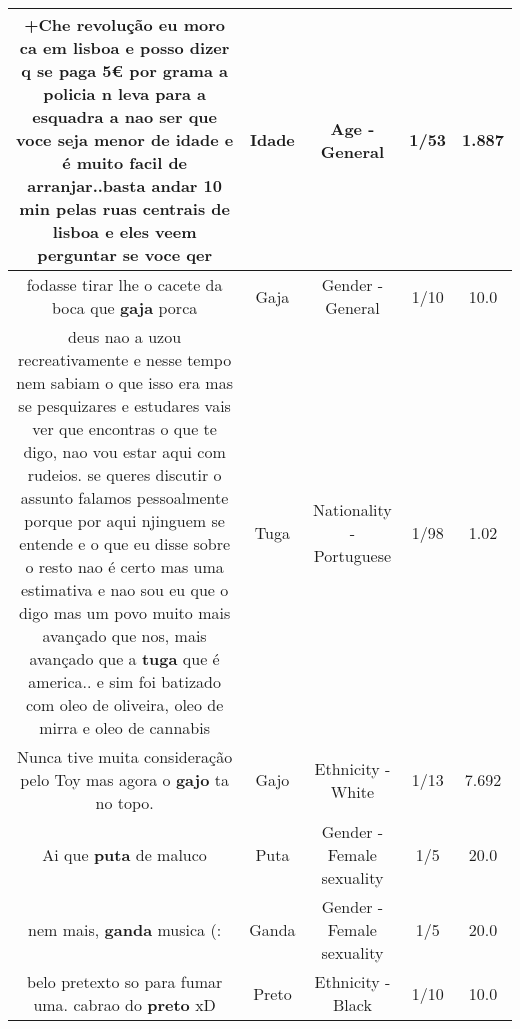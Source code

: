 \documentclass[11pt]{article}
\newlength\mylength
\begin{document}
\begin{center}
\begin{longtable}{|C{.65\mylength}|C{.30\mylength}|C{.12\mylength}|C{.12\mylength}|C{.12\mylength}|}
  \small +Che revolução eu moro ca em lisboa e posso dizer q se paga 5€ por grama a policia n leva para a esquadra a nao ser que voce seja menor de \textbf{idade} e é muito facil de arranjar..basta andar 10 min pelas ruas centrais de lisboa e eles veem perguntar se voce qer\normalsize   & Idade & Age - General & 1/53 & 1.887 \\  \hline
  \small fodasse tirar lhe o cacete da boca que \textbf{gaja} porca\normalsize   & Gaja & Gender - General & 1/10 & 10.0 \\  \hline
  \small deus nao a uzou recreativamente e nesse tempo nem sabiam o que isso era mas se pesquizares e estudares vais ver que encontras o que te digo, nao vou estar aqui com rudeios. se queres discutir o assunto falamos pessoalmente porque por aqui njinguem se entende e o que eu disse sobre o resto nao é certo mas uma estimativa e nao sou eu que o digo mas um povo muito mais avançado que nos, mais avançado que a \textbf{tuga} que é america.. e sim foi batizado com oleo de oliveira, oleo de mirra e oleo de cannabis\normalsize   & Tuga & Nationality - Portuguese & 1/98 & 1.02 \\  \hline
  \small Nunca tive muita consideração pelo Toy mas agora o \textbf{gajo} ta no topo.\normalsize   & Gajo & Ethnicity - White & 1/13 & 7.692 \\  \hline
  \small Ai que \textbf{puta} de maluco\normalsize   & Puta & Gender - Female sexuality & 1/5 & 20.0 \\  \hline
  \small nem mais, \textbf{ganda} musica (:\normalsize   & Ganda & Gender - Female sexuality & 1/5 & 20.0 \\  \hline
  \small belo pretexto so para fumar uma. cabrao do \textbf{preto} xD\normalsize   & Preto & Ethnicity - Black & 1/10 & 10.0 \\  \hline

\end{longtable}
\end{center}
\end{document}
